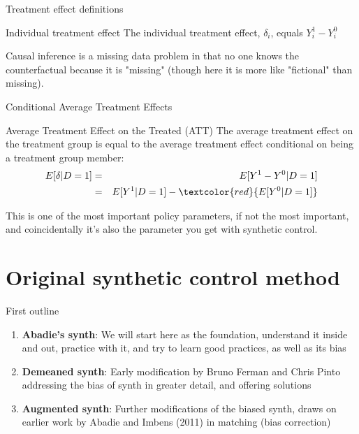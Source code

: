 \documentclass{beamer}
\begin{document}
\begin{frame}{Treatment effect definitions}


	\begin{block}{Individual treatment effect}
	    The individual treatment effect,  $\delta_i$, equals $Y_i^1-Y_i^0$
	\end{block}

Causal inference is a missing data problem in that no one knows the counterfactual because it is "missing" (though here it is more like "fictional" than missing).
	
\end{frame}


\begin{frame}{Conditional Average Treatment Effects}	
	\begin{block}{Average Treatment Effect on the Treated (ATT)}
	The average treatment effect on the treatment group is equal to the average treatment effect conditional on being a treatment group member:
		\begin{eqnarray*}
		E[\delta|D=1]&=&E[Y^1-Y^0|D=1] \nonumber \\
		&=&E[Y^1|D=1]-\textcolor{red}{E[Y^0|D=1]}
		\end{eqnarray*}
	\end{block}
	
	\bigskip

This is one of the most important policy parameters, if not the most important, and coincidentally it's also the parameter you get with synthetic control.  

	
\end{frame}




\section{Original synthetic control method}


\begin{frame}{First outline}

\begin{enumerate}
\item \textbf{Abadie's synth}: We will start here as the foundation, understand it inside and out, practice with it, and try to learn good practices, as well as its bias
\item \textbf{Demeaned synth}: Early modification by Bruno Ferman and Chris Pinto addressing the bias of synth in greater detail, and offering solutions
\item \textbf{Augmented synth}: Further modifications of the biased synth, draws on earlier work by Abadie and Imbens (2011) in matching (bias correction)
\end{enumerate}

\end{frame}
\end{document}
